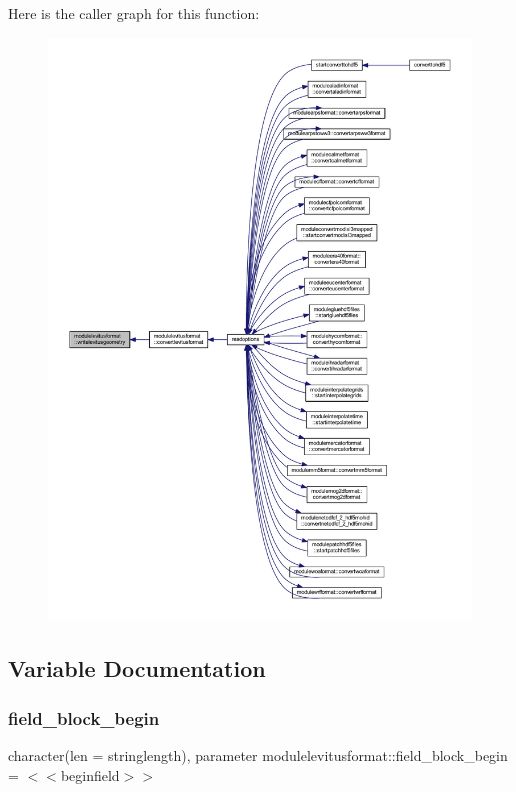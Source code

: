Here is the caller graph for this function\+:\nopagebreak
\begin{figure}[H]
\begin{center}
\leavevmode
\includegraphics[width=350pt]{namespacemodulelevitusformat_a6b331414c3615b8cf034262b51b17a6b_icgraph}
\end{center}
\end{figure}


\subsection{Variable Documentation}
\mbox{\label{namespacemodulelevitusformat_a9af934d53d17b725109ed386a7682f11}} 
\subsubsection{\texorpdfstring{field\+\_\+block\+\_\+begin}{field\_block\_begin}}
{\footnotesize\ttfamily character(len = stringlength), parameter modulelevitusformat\+::field\+\_\+block\+\_\+begin = \textquotesingle{}$<$$<$beginfield$>$$>$\textquotesingle{}\hspace{0.3cm}{\ttfamily [private]}}

